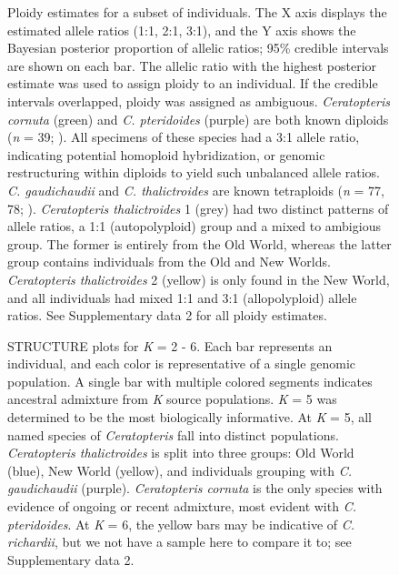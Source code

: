 \documentclass[12pt]{article}
\begin{document}
\begin{figure}[H]
\centering
\caption{Ploidy estimates for a subset of individuals. The X axis displays the estimated allele ratios (1:1, 2:1, 3:1), and the Y axis shows the Bayesian posterior proportion of allelic ratios; 95\% credible intervals are shown on each bar. The allelic ratio with the highest posterior estimate was used to assign ploidy to an individual. If the credible intervals overlapped, ploidy was assigned as ambiguous. \textit{Ceratopteris cornuta} (green) and \textit{C. pteridoides} (purple) are both known diploids (\textit{n} = 39; \cite{Hickok1977}). All specimens of these species had a 3:1 allele ratio, indicating potential homoploid hybridization, or genomic restructuring within diploids to yield such unbalanced allele ratios. \textit{C. gaudichaudii} and \textit{C. thalictroides} are known tetraploids (\textit{n} = 77, 78; \cite{Masuyama2010}). \textit{Ceratopteris thalictroides} 1 (grey) had two distinct patterns of allele ratios, a 1:1 (autopolyploid) group and a mixed to ambigious group. The former is entirely from the Old World, whereas the latter group contains individuals from the Old and New Worlds. \textit{Ceratopteris thalictroides} 2 (yellow) is only found in the New World, and all individuals had mixed 1:1 and 3:1 (allopolyploid) allele ratios. See Supplementary data 2 for all ploidy estimates.}
\label{g2p}
\end{figure}

\begin{figure}[H]
\centering
\caption{{\small{STRUCTURE}} plots for \textit{K} = 2 - 6. Each bar represents an individual, and each color is representative of a single genomic population. A single bar with multiple colored segments indicates ancestral admixture from \textit{K} source populations. \textit{K} = 5 was determined to be the most biologically informative. At \textit{K} = 5, all named species of \textit{Ceratopteris} fall into distinct populations. \textit{Ceratopteris thalictroides} is split into three groups: Old World (blue), New World (yellow), and individuals grouping with \textit{C. gaudichaudii} (purple). \textit{Ceratopteris cornuta} is the only species with evidence of ongoing or recent admixture, most evident with \textit{C. pteridoides}. At \textit{K} = 6, the yellow bars may be indicative of \textit{C. richardii}, but we not have a sample here to compare it to; see Supplementary data 2.}
\label{structure}
\end{figure}
\end{document}
